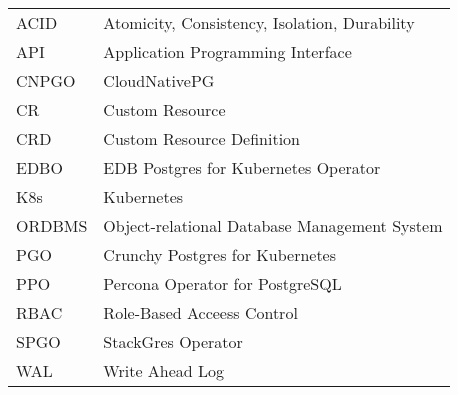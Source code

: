 
\seznamzkr

\begin{tabular}{ll}
  ACID   & Atomicity, Consistency, Isolation, Durability \\
  API    & Application Programming Interface             \\
  CNPGO  & CloudNativePG                                 \\
  CR     & Custom Resource                               \\
  CRD    & Custom Resource Definition                    \\
  EDBO   & EDB Postgres for Kubernetes Operator          \\
  K8s    & Kubernetes                                    \\
  ORDBMS & Object-relational Database Management System  \\
  PGO    & Crunchy Postgres for Kubernetes               \\
  PPO    & Percona Operator for PostgreSQL               \\
  RBAC   & Role-Based Acceess Control                    \\
  SPGO   & StackGres Operator                            \\
  WAL    & Write Ahead Log                               \\
\end{tabular}

